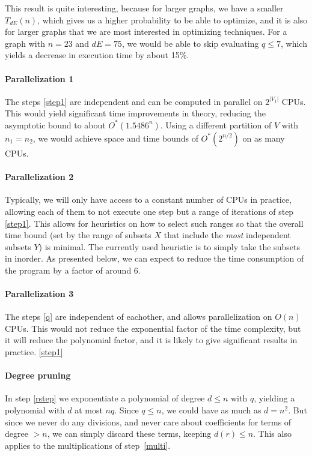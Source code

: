 \documentclass[a4paper]{article}
\begin{document}
This result is quite interesting, because for larger graphs, we have a smaller $T_{dE}(n)$, which gives us a higher probability to be able to optimize, and it is also for larger graphs that we are most interested in optimizing techniques. For a graph with $n=23$ and $dE = 75$, we would be able to skip evaluating $q\leq7$, which yields a decrease in execution time by about 15\%\footnotemark. %


\paragraph{Parallelization 1} The steps \ref{step1} are independent and can be computed in parallel on $2^{|V_1|}$ CPUs. This would yield significant time improvements in theory, reducing the asymptotic bound to about $O^*(1.5486^n)$. Using a different partition of $V$ with $n_1 = n_2$, we would achieve space and time bounds of $O^*(2^{n/2})$ on as many CPUs. \cite{cov_pack}

\paragraph{Parallelization 2} Typically, we will only have access to a constant number of CPUs in practice, allowing each of them to not execute one step but a range of iterations of step \ref{step1}. This allows for heuristics on how to select such ranges so that the overall time bound (set by the range of subsets $X$ that include the \emph{most} independent subsets $Y$) is minimal. The currently used heuristic is to simply take the subsets in inorder. As presented below, we can expect to reduce the time consumption of the program by a factor of around 6. %

\paragraph{Parallelization 3} The steps \ref{q} are independent of eachother, and allows parallelization on $O(n)$ CPUs. This would not reduce the exponential factor of the time complexity, but it will reduce the polynomial factor, and it is likely to give significant results in practice. \ref{step1}

\paragraph{Degree pruning} In step \ref{rstep} we exponentiate a polynomial of degree $d \leq n$ with $q$, yielding a polynomial with $d$ at most $nq$. Since $q \leq n$, we could have as much as $d = n^2$. But since we never do any divisions, and never care about coefficients for terms of degree $> n$, we can simply discard these terms, keeping $d(r) \leq n$. This also applies to the multiplications of step~\ref{multi}.
\end{document}
